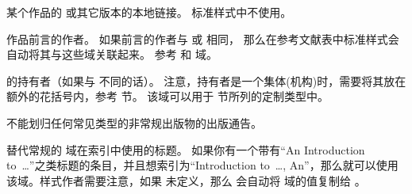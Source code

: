 \begin{fieldlist}

某个作品的  或其它版本的本地链接。
标准样式中不使用。




作品前言的作者。
如果前言的作者与  或  相同，
那么在参考文献表中标准样式会自动将其与这些域关联起来。
参考  和  域。




 的持有者（如果与  不同的话）。
注意，持有者是一个集体(机构)时，需要将其放在额外的花括号内，参考  节。
该域可以用于  节所列的定制类型中。




不能划归任何常见类型的非常规出版物的出版通告。



替代常规的  域在索引中使用的标题。
如果你有一个带有“An Introduction to~\dots”之类标题的条目，并且想索引为“Introduction to~\dots, An”，那么就可以使用该域。样式作者需要注意，如果  未定义，那么 \biblatex 会自动将  域的值复制给 。


\end{fieldlist}
